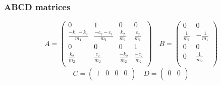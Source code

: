 \subsubsection{ABCD matrices}
$$
A = \begin{pmatrix}
    0 & 1 & 0 & 0 \\
    \frac{-k_1-k_2}{m_1} & \frac{-c_2-c_1}{m_1} & \frac{k_2}{m_1} & \frac{c_2}{m_1} \\
    0 & 0 & 0 & 1 \\ 
    \frac{k_2}{m_2} & \frac{c_2}{m_2} & \frac{-k_2}{m_2} & \frac{-c_2}{m_2}\\
\end{pmatrix}
\quad
B = \begin{pmatrix}
    0 & 0\\
    \frac{1}{m_1} & -\frac{1}{m_1}\\
    0 & 0\\
    0 & \frac{1}{m_2}\\
\end{pmatrix}
$$
$$
C = \begin{pmatrix}
    1 & 0 & 0 & 0\\
\end{pmatrix}
\quad
D = \begin{pmatrix}
    0 & 0\\
\end{pmatrix}
$$
